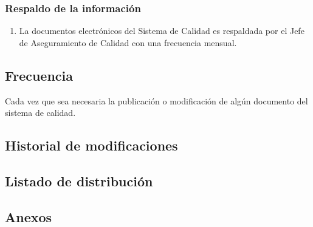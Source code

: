 \subsubsection{Respaldo de la información}

\begin{enumerate}
	\item La documentos electrónicos del Sistema de Calidad es respaldada por el Jefe de Aseguramiento de Calidad con una frecuencia mensual.
\end{enumerate}

\subsection{Frecuencia}

Cada vez que sea necesaria la publicación o modificación de algún documento del sistema de calidad.

\subsection{Historial de modificaciones}

\subsection{Listado de distribución}


\subsection{Anexos}
